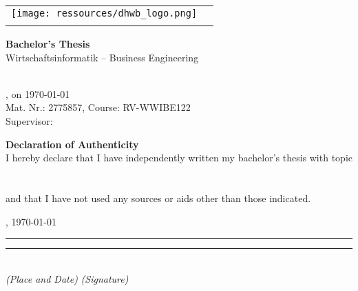 \begin{titlepage}
	\noindent
    \begin{tabularx}{\textwidth}{@{}l|X@{}}
		\texttt{[image: ressources/dhwb\_logo.png]} &
		\begin{minipage}[t]{\linewidth}
			\raggedright
			\Large \textbf{\myTitle} \\
			\vspace{0.5cm}
			\normalsize \mySubtitle
		\end{minipage}
	\end{tabularx}
	
    \vfill
    \centering
    \Large\textbf{Bachelor's Thesis} \\
    \vspace{1cm}
    \normalsize
    Wirtschaftsinformatik – Business Engineering\\
    \myHighSchool\\
    \myLocation
	
    \vfill
	\small
	\myName, on \today \\
	Mat. Nr.: 2775857, Course: RV-WWIBE122 \\
	Supervisor: \mySupervisor
\end{titlepage}

\clearpage
\thispagestyle{empty}
\begin{center}
	\Huge\textbf{Declaration of Authenticity}\\
    \vspace{4cm}
	\normalsize
	I hereby declare that I have independently written my bachelor's thesis with topic\\
    
    \vfill
    \Large \textbf{\myTitle} \\
    \large \mySubtitle \\
	
    \vfill
    \normalsize
	and that I have not used any sources or aids other than those indicated.\\
\end{center}
\vspace{4cm}
\myLocation, \today \\
\rule{6cm}{0.1pt} \hfill \rule{6cm}{0.1pt} \\
\textit{(Place and Date)} \hfill \textit{(Signature)}
\newpage


